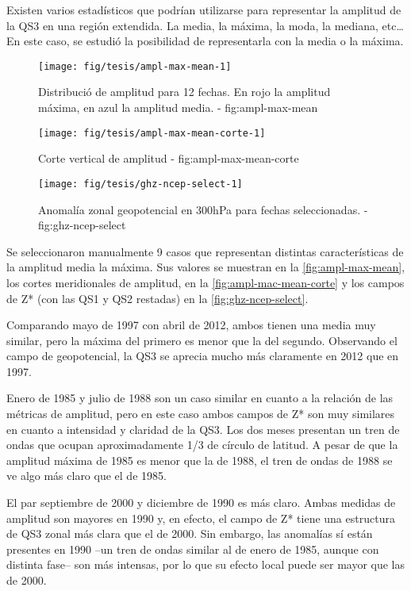 \documentclass[spanish,a4paper]{book}
\begin{document}
Existen varios estadísticos que podrían utilizarse para representar la
amplitud de la QS3 en una región extendida. La media, la máxima, la
moda, la mediana, etc\ldots{} En este caso, se estudió la posibilidad de
representarla con la media o la
máxima.

\begin{figure*}
\texttt{[image: fig/tesis/ampl-max-mean-1]} \caption{Distribució de amplitud para 12 fechas. En rojo la amplitud máxima, en azul la amplitud media. - fig:ampl-max-mean}\label{fig:ampl-max-mean}
\end{figure*}

\begin{figure*}
\texttt{[image: fig/tesis/ampl-max-mean-corte-1]} \caption{Corte vertical de amplitud - fig:ampl-max-mean-corte}\label{fig:ampl-max-mean-corte}
\end{figure*}

\begin{figure*}
\texttt{[image: fig/tesis/ghz-ncep-select-1]} \caption{Anomalía zonal geopotencial en 300hPa para fechas seleccionadas. - fig:ghz-ncep-select}\label{fig:ghz-ncep-select}
\end{figure*}

Se seleccionaron manualmente 9 casos que representan distintas
características de la amplitud media la máxima. Sus valores se muestran
en la \autoref{fig:ampl-max-mean}, los cortes meridionales de amplitud,
en la \autoref{fig:ampl-mac-mean-corte} y los campos de Z* (con las QS1
y QS2 restadas) en la \autoref{fig:ghz-ncep-select}.

Comparando mayo de 1997 con abril de 2012, ambos tienen una media muy
similar, pero la máxima del primero es menor que la del segundo.
Observando el campo de geopotencial, la QS3 se aprecia mucho más
claramente en 2012 que en 1997.

Enero de 1985 y julio de 1988 son un caso similar en cuanto a la
relación de las métricas de amplitud, pero en este
caso ambos campos de Z* son muy similares en cuanto
a intensidad y claridad de la QS3. Los dos meses presentan un tren de
ondas que ocupan aproximadamente 1/3 de círculo de latitud. A pesar de
que la amplitud máxima de 1985 es menor que la de 1988, el tren de ondas
de 1988 se ve algo más claro que el de 1985.

El par septiembre de 2000 y diciembre de 1990 es más claro. Ambas
medidas de amplitud son mayores en 1990 y, en efecto, el campo de Z*
tiene una estructura de QS3 zonal más clara que el de 2000. Sin embargo,
las anomalías sí están presentes en 1990 --un tren de ondas similar al
de enero de 1985, aunque con distinta fase-- son más intensas, por lo
que su efecto local puede ser mayor que las de 2000.
\end{document}
